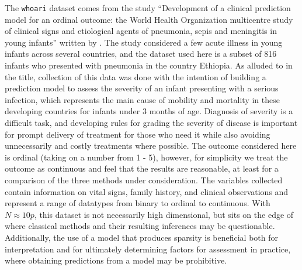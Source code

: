 The \texttt{whoari} dataset comes from the study ``Development of a clinical prediction model for an ordinal outcome: the World Health Organization multicentre study of clinical signs and etiological agents of pneumonia, sepis and meningitis in young infants'' written by \cite{Harrell1998}. The study considered a few acute illness in young infants across several countries, and the dataset used here is a subset of 816 infants who presented with pneumonia in the country Ethiopia. As alluded to in the title, collection of this data was done with the intention of building a prediction model to assess the severity of an infant presenting with a serious infection, which represents the main cause of mobility and mortality in these developing countries for infants under 3 months of age. Diagnosis of severity is a difficult task, and developing rules for grading the severity of disease is important for prompt delivery of treatment for those who need it while also avoiding unnecessarily and costly treatments where possible. The outcome considered here is ordinal (taking on a number from 1 - 5), however, for simplicity we treat the outcome as continuous and feel that the results are reasonable, at least for a comparison of the three methods under consideration. The variables collected contain information on vital signs, family history, and clinical observations and represent a range of datatypes from binary to ordinal to continuous. With $N \approx 10p$, this dataset is not necessarily high dimensional, but sits on the edge of where classical methods and their resulting inferences may be questionable. Additionally, the use of a model that produces sparsity is beneficial both for interpretation and for ultimately determining factors for assessment in practice, where obtaining predictions from a model may be prohibitive.

